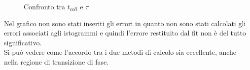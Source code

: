 \begin{center}
	\begin{figure}
		\centering
	\caption{Confronto tra $t_{coll}$ e $\tau$}
	\end{figure}
\end{center}
Nel grafico non sono stati inseriti gli errori in quanto non sono stati calcolati gli errori associati agli istogrammi e quindi l'errore restituito dal fit non è del tutto significativo.\\
Si può vedere come l'accordo tra i due metodi di calcolo sia eccellente, anche nella regione di transizione di fase.

